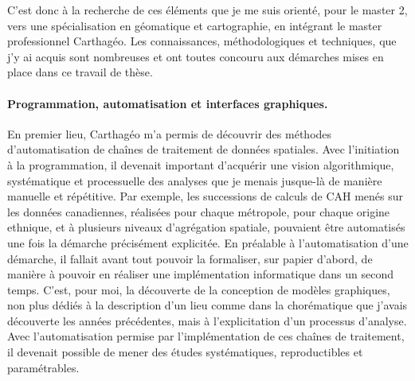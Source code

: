 C'est donc à la recherche de ces éléments que je me suis orienté, pour le master 2, vers une spécialisation en géomatique et cartographie, en intégrant le master professionnel Carthagéo.
Les connaissances, méthodologiques et techniques, que j'y ai acquis sont nombreuses et ont toutes concouru aux démarches mises en place dans ce travail de thèse.

\paragraph{Programmation, automatisation et interfaces graphiques.}

En premier lieu, Carthagéo m'a permis de découvrir des méthodes d'automatisation de chaînes de traitement de données spatiales.
Avec l'initiation à la programmation, il devenait important d'acquérir une vision algorithmique, systématique et processuelle des analyses que je menais jusque-là de manière manuelle et répétitive.
Par exemple, les successions de calculs de CAH menés sur les données canadiennes, réalisées pour chaque métropole, pour chaque origine ethnique, et à plusieurs niveaux d'agrégation spatiale, pouvaient être automatisés une fois la démarche précisément explicitée.
En préalable à l'automatisation d'une démarche, il fallait avant tout pouvoir la formaliser, sur papier d'abord, de manière à pouvoir en réaliser une implémentation informatique dans un second temps.
C'est, pour moi, la découverte de la conception de modèles graphiques, non plus dédiés à la description d'un lieu comme dans la chorématique que j'avais découverte les années précédentes, mais à l'explicitation d'un processus d'analyse.
Avec l'automatisation permise par l'implémentation de ces chaînes de traitement, il devenait possible de mener des études systématiques, reproductibles et paramétrables.

